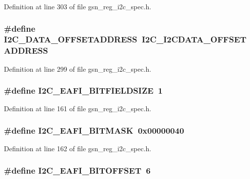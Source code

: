 Definition at line 303 of file gsn\_\-reg\_\-i2c\_\-spec.h.

\hypertarget{a00558_ac1901b75b0d0f56a95e66ff7e9622b51}{
\subsubsection[{I2C\_\-DATA\_\-OFFSETADDRESS}]{\setlength{\rightskip}{0pt plus 5cm}\#define I2C\_\-DATA\_\-OFFSETADDRESS~I2C\_\-I2CDATA\_\-OFFSETADDRESS}}
\label{a00558_ac1901b75b0d0f56a95e66ff7e9622b51}


Definition at line 299 of file gsn\_\-reg\_\-i2c\_\-spec.h.

\hypertarget{a00558_aa1feb4f38f53a6368e830ce20d696fa7}{
\subsubsection[{I2C\_\-EAFI\_\-BITFIELDSIZE}]{\setlength{\rightskip}{0pt plus 5cm}\#define I2C\_\-EAFI\_\-BITFIELDSIZE~1}}
\label{a00558_aa1feb4f38f53a6368e830ce20d696fa7}


Definition at line 161 of file gsn\_\-reg\_\-i2c\_\-spec.h.

\hypertarget{a00558_a5be2e10eb9ee8cc18f300279e139a695}{
\subsubsection[{I2C\_\-EAFI\_\-BITMASK}]{\setlength{\rightskip}{0pt plus 5cm}\#define I2C\_\-EAFI\_\-BITMASK~0x00000040}}
\label{a00558_a5be2e10eb9ee8cc18f300279e139a695}


Definition at line 162 of file gsn\_\-reg\_\-i2c\_\-spec.h.

\hypertarget{a00558_a154cf7ce1bf53e2d8830e12f296ed738}{
\subsubsection[{I2C\_\-EAFI\_\-BITOFFSET}]{\setlength{\rightskip}{0pt plus 5cm}\#define I2C\_\-EAFI\_\-BITOFFSET~6}}
\label{a00558_a154cf7ce1bf53e2d8830e12f296ed738}


